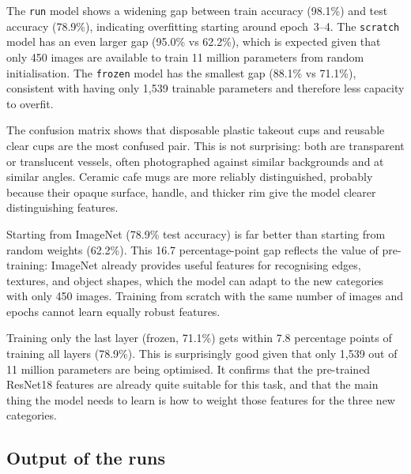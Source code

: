 \documentclass[11pt]{article}
\begin{document}
The \texttt{run} model shows a widening gap between train accuracy (98.1\%) and test accuracy (78.9\%), indicating overfitting starting around epoch~3--4. The \texttt{scratch} model has an even larger gap (95.0\% vs 62.2\%), which is expected given that only 450 images are available to train 11 million parameters from random initialisation. The \texttt{frozen} model has the smallest gap (88.1\% vs 71.1\%), consistent with having only 1,539 trainable parameters and therefore less capacity to overfit.

\begin{center}\end{center}

The confusion matrix shows that disposable plastic takeout cups and reusable clear cups are the most confused pair. This is not surprising: both are transparent or translucent vessels, often photographed against similar backgrounds and at similar angles. Ceramic cafe mugs are more reliably distinguished, probably because their opaque surface, handle, and thicker rim give the model clearer distinguishing features.

Starting from ImageNet (78.9\% test accuracy) is far better than starting from random weights (62.2\%). This 16.7 percentage-point gap reflects the value of pre-training: ImageNet already provides useful features for recognising edges, textures, and object shapes, which the model can adapt to the new categories with only 450 images. Training from scratch with the same number of images and epochs cannot learn equally robust features.

Training only the last layer (frozen, 71.1\%) gets within 7.8 percentage points of training all layers (78.9\%). This is surprisingly good given that only 1,539 out of 11 million parameters are being optimised. It confirms that the pre-trained ResNet18 features are already quite suitable for this task, and that the main thing the model needs to learn is how to weight those features for the three new categories.

\subsection*{Output of the runs}

\end{document}

